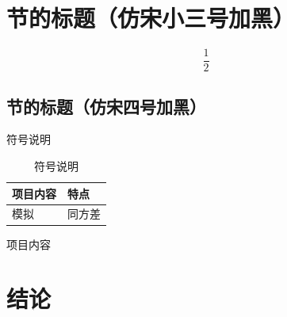 \section{节的标题（仿宋小三号加黑）}
\begin{equation}
\frac{1}{2}
\end{equation}
\subsection{节的标题（仿宋四号加黑）}

符号说明
{\wuhao
\begin{longtable}{p{5cm}p{5cm}}
\caption{符号说明}\\
\hline
项目内容 & 特点\\
\hline
模拟& 同方差\\
\hline
\end{longtable}
}
项目内容

\section{结论}

\printbibliography[heading=chapbib]